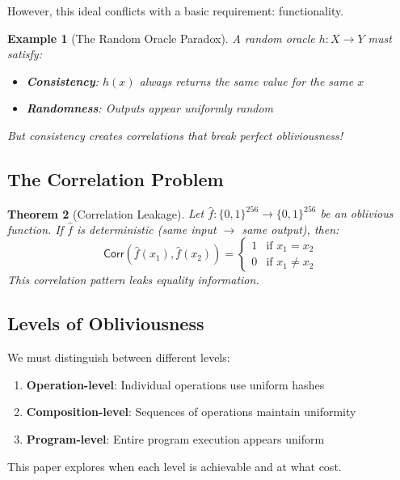 \documentclass[11pt,final,hidelinks]{article}
\newcommand{\HashSpace}{\{0,1\}^{256}}
\newcommand{\Correlation}{\mathsf{Corr}}
\newtheorem{theorem}{Theorem}[section]
\newtheorem{example}[theorem]{Example}
\begin{document}
However, this ideal conflicts with a basic requirement: functionality.

\begin{example}[The Random Oracle Paradox]
A random oracle $h: X \to Y$ must satisfy:
\begin{itemize}
    \item \textbf{Consistency}: $h(x)$ always returns the same value for the same $x$
    \item \textbf{Randomness}: Outputs appear uniformly random
\end{itemize}
But consistency creates correlations that break perfect obliviousness!
\end{example}

\subsection{The Correlation Problem}

\begin{theorem}[Correlation Leakage]
Let $\hat{f}: \HashSpace \to \HashSpace$ be an oblivious function. If $\hat{f}$ is deterministic (same input $\to$ same output), then:
\begin{equation}
\Correlation(\hat{f}(x_1), \hat{f}(x_2)) = \begin{cases}
1 & \text{if } x_1 = x_2\\
0 & \text{if } x_1 \neq x_2
\end{cases}
\end{equation}
This correlation pattern leaks equality information.
\end{theorem}

\subsection{Levels of Obliviousness}

We must distinguish between different levels:

\begin{enumerate}
    \item \textbf{Operation-level}: Individual operations use uniform hashes
    \item \textbf{Composition-level}: Sequences of operations maintain uniformity
    \item \textbf{Program-level}: Entire program execution appears uniform
\end{enumerate}

This paper explores when each level is achievable and at what cost.
\end{document}
